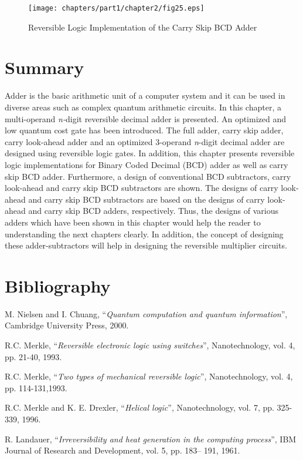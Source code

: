 \begin{figure}[!tbh]
	\centering
	\texttt{[image: chapters/part1/chapter2/fig25.eps]}
	\caption{Reversible Logic Implementation of the Carry Skip BCD Adder}
	\label{fig:p1_c2_fig25}
\end{figure}
\section{Summary}

Adder is the basic arithmetic unit of a computer system and it can be used in diverse areas such as complex quantum arithmetic circuits. In this chapter, a multi-operand {\it n-}digit reversible decimal adder is presented. An optimized and low quantum cost gate has been introduced. The full adder, carry skip adder, carry look-ahead adder and an optimized 3-operand {\it n}-digit decimal adder are designed using reversible logic gates. In addition, this chapter presents reversible logic implementations for Binary Coded Decimal (BCD) adder as well as carry skip BCD adder. Furthermore, a design of conventional BCD subtractors, carry look-ahead and carry skip BCD subtractors are shown. The designs of carry look-ahead and carry skip BCD subtractors are based on the designs of carry look-ahead and carry skip BCD adders, respectively. Thus, the designs of various adders which have been shown in this chapter would help the reader to understanding the next chapters clearly. In addition, the concept of designing these adder-subtractors will help in designing the reversible multiplier circuits.

\section*{Bibliography}

\noindent [1] M. Nielsen and I. Chuang, ``{\it Quantum computation and quantum information}'', Cambridge University Press, 2000.

\noindent [2] R.C. Merkle, ``{\it Reversible electronic logic using switches}'', Nanotechnology, vol. 4, pp. 21-40, 1993. 

\noindent [3] R.C. Merkle, ``{\it Two types of mechanical reversible logic}'', Nanotechnology, vol. 4, pp. 114-131,1993. 

\noindent [4] R.C.  Merkle and K. E. Drexler, ``{\it Helical logic}'', Nanotechnology, vol. 7, pp. 325-339, 1996. 

\noindent [5] R. Landauer, ``{\it Irreversibility and heat generation in the computing process}'', IBM Journal of Research and Development, vol. 5, pp. 183-- 191, 1961.

